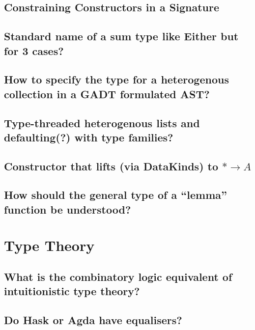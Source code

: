 \documentclass{book}
\begin{document}
\section{Constraining Constructors in a Signature}


\section{Standard name of a sum type like Either but for 3 cases?}


\section{How to specify the type for a heterogenous collection in a GADT formulated AST?}


\section{Type-threaded heterogenous lists and defaulting(?) with type families?}


\section{Constructor that lifts (via DataKinds) to $\ast\to A$}


\section{How should the general type of a ``lemma'' function be understood?}



\chapter{Type Theory}

\section{What is the combinatory logic equivalent of intuitionistic type theory?}


\section{Do Hask or Agda have equalisers?}

\end{document}
